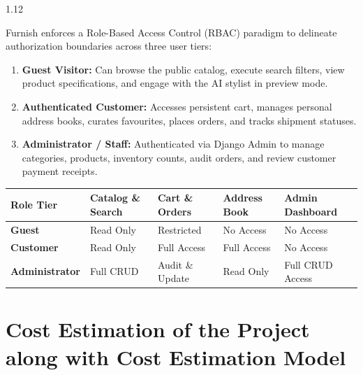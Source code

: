 \documentclass[12pt,a4paper]{article}
\begin{document}
{\fontsize{12.5}{17}\selectfont
\begin{spacing}{1.12}

\noindent
Furnish enforces a Role-Based Access Control (RBAC) paradigm to delineate authorization boundaries across three user tiers:
\begin{enumerate}
    \setlength{\itemsep}{1.5pt}
    \item \textbf{Guest Visitor:} Can browse the public catalog, execute search filters, view product specifications, and engage with the AI stylist in preview mode.
    \item \textbf{Authenticated Customer:} Accesses persistent cart, manages personal address books, curates favourites, places orders, and tracks shipment statuses.
    \item \textbf{Administrator / Staff:} Authenticated via Django Admin to manage categories, products, inventory counts, audit orders, and review customer payment receipts.
\end{enumerate}

\vspace{0.06in}

\begin{center}
\renewcommand{\arraystretch}{1.15}
\fontsize{9.5}{13}\selectfont
\begin{tabular}{|p{1.5in}|p{1.1in}|p{1.1in}|p{1.2in}|p{1.2in}|}
\hline
\textbf{Role Tier} & \textbf{Catalog \& Search} & \textbf{Cart \& Orders} & \textbf{Address Book} & \textbf{Admin Dashboard} \\ \hline
\textbf{Guest} & Read Only & Restricted & No Access & No Access \\ \hline
\textbf{Customer} & Read Only & Full Access & Full Access & No Access \\ \hline
\textbf{Administrator} & Full CRUD & Audit \& Update & Read Only & Full CRUD Access \\ \hline
\end{tabular}
\end{center}

\end{spacing}
}

\vspace{0.1in}



\section{Cost Estimation of the Project along with Cost Estimation Model}
\end{document}
